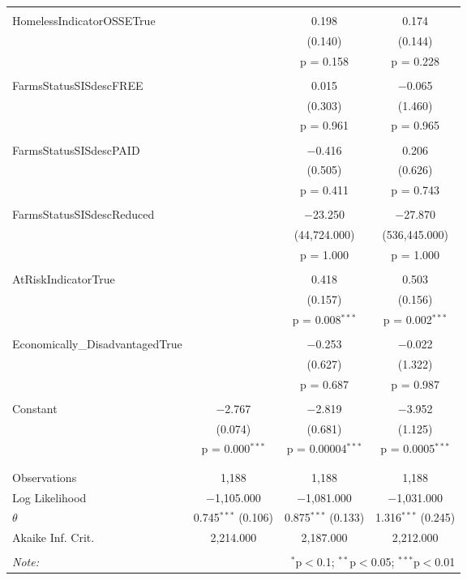 \begin{table}[!htbp]
\begin{tabular}{@{\extracolsep{5pt}}lccc}
  & & & \\ 
 HomelessIndicatorOSSETrue &  & 0.198 & 0.174 \\ 
  &  & (0.140) & (0.144) \\ 
  &  & p = 0.158 & p = 0.228 \\ 
  & & & \\ 
 FarmsStatusSISdescFREE &  & 0.015 & $-$0.065 \\ 
  &  & (0.303) & (1.460) \\ 
  &  & p = 0.961 & p = 0.965 \\ 
  & & & \\ 
 FarmsStatusSISdescPAID &  & $-$0.416 & 0.206 \\ 
  &  & (0.505) & (0.626) \\ 
  &  & p = 0.411 & p = 0.743 \\ 
  & & & \\ 
 FarmsStatusSISdescReduced &  & $-$23.250 & $-$27.870 \\ 
  &  & (44,724.000) & (536,445.000) \\ 
  &  & p = 1.000 & p = 1.000 \\ 
  & & & \\ 
 AtRiskIndicatorTrue &  & 0.418 & 0.503 \\ 
  &  & (0.157) & (0.156) \\ 
  &  & p = 0.008$^{***}$ & p = 0.002$^{***}$ \\ 
  & & & \\ 
 Economically\_DisadvantagedTrue &  & $-$0.253 & $-$0.022 \\ 
  &  & (0.627) & (1.322) \\ 
  &  & p = 0.687 & p = 0.987 \\ 
  & & & \\ 
 Constant & $-$2.767 & $-$2.819 & $-$3.952 \\ 
  & (0.074) & (0.681) & (1.125) \\ 
  & p = 0.000$^{***}$ & p = 0.00004$^{***}$ & p = 0.0005$^{***}$ \\ 
  & & & \\ 
\hline \\[-1.8ex] 
Observations & 1,188 & 1,188 & 1,188 \\ 
Log Likelihood & $-$1,105.000 & $-$1,081.000 & $-$1,031.000 \\ 
$\theta$ & 0.745$^{***}$  (0.106) & 0.875$^{***}$  (0.133) & 1.316$^{***}$  (0.245) \\ 
Akaike Inf. Crit. & 2,214.000 & 2,187.000 & 2,212.000 \\ 
\hline 
\hline \\[-1.8ex] 
\textit{Note:}  & \multicolumn{3}{r}{$^{*}$p$<$0.1; $^{**}$p$<$0.05; $^{***}$p$<$0.01} \\ 
\end{tabular} 
\end{table} 
